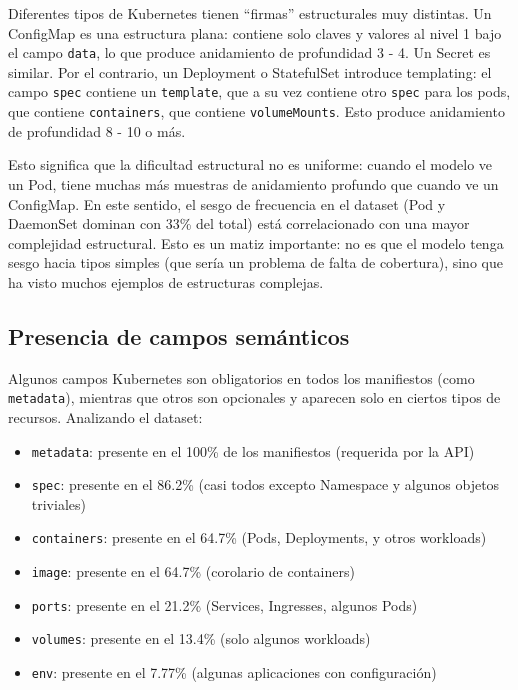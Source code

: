 Diferentes tipos de Kubernetes tienen ``firmas'' estructurales muy distintas. Un ConfigMap es una estructura plana: contiene solo claves y valores al nivel 1 bajo el
campo \texttt{data}, lo que produce anidamiento de profundidad 3 - 4. Un Secret es similar. Por el contrario, un Deployment o StatefulSet introduce templating: el campo
\texttt{spec} contiene un \texttt{template}, que a su vez contiene otro \texttt{spec} para los pods, que contiene \texttt{containers}, que contiene \texttt{volumeMounts}.
Esto produce anidamiento de profundidad 8 - 10 o más.

Esto significa que la dificultad estructural no es uniforme: cuando el modelo ve un Pod, tiene muchas más muestras de anidamiento profundo que cuando ve un ConfigMap.
En este sentido, el sesgo de frecuencia en el dataset (Pod y DaemonSet dominan con 33\% del total) está correlacionado con una mayor complejidad estructural. Esto es un
matiz importante: no es que el modelo tenga sesgo hacia tipos simples (que sería un problema de falta de cobertura), sino que ha visto muchos ejemplos de
estructuras complejas.

\subsection{Presencia de campos semánticos}

Algunos campos Kubernetes son obligatorios en todos los manifiestos (como \texttt{metadata}), mientras que otros son opcionales y aparecen solo en ciertos tipos de recursos.
Analizando el dataset:

\begin{itemize}
\item \texttt{metadata}: presente en el 100\% de los manifiestos (requerida por la API)
\item \texttt{spec}: presente en el 86.2\% (casi todos excepto Namespace y algunos objetos triviales)
\item \texttt{containers}: presente en el 64.7\% (Pods, Deployments, y otros workloads)
\item \texttt{image}: presente en el 64.7\% (corolario de containers)
\item \texttt{ports}: presente en el 21.2\% (Services, Ingresses, algunos Pods)
\item \texttt{volumes}: presente en el 13.4\% (solo algunos workloads)
\item \texttt{env}: presente en el 7.77\% (algunas aplicaciones con configuración)
\end{itemize}

